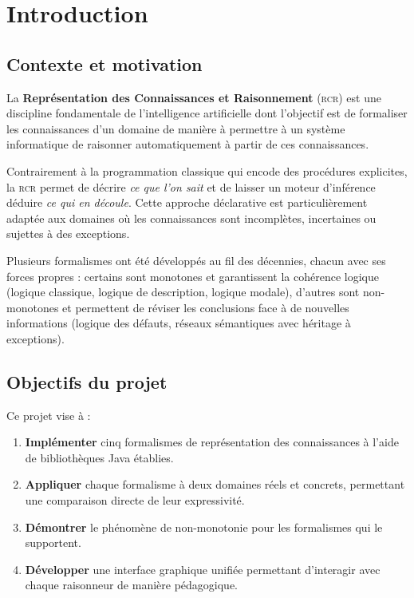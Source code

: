 \chapter{Introduction}

\section{Contexte et motivation}

La \textbf{Représentation des Connaissances et Raisonnement} (\textsc{rcr}) est
une discipline fondamentale de l'intelligence artificielle dont l'objectif est de
formaliser les connaissances d'un domaine de manière à permettre à un système
informatique de raisonner automatiquement à partir de ces connaissances.

Contrairement à la programmation classique qui encode des procédures explicites,
la \textsc{rcr} permet de décrire \emph{ce que l'on sait} et de laisser un
moteur d'inférence déduire \emph{ce qui en découle}. Cette approche déclarative
est particulièrement adaptée aux domaines où les connaissances sont incomplètes,
incertaines ou sujettes à des exceptions.

Plusieurs formalismes ont été développés au fil des décennies, chacun avec ses
forces propres : certains sont monotones et garantissent la cohérence logique
(logique classique, logique de description, logique modale), d'autres sont
non-monotones et permettent de réviser les conclusions face à de nouvelles
informations (logique des défauts, réseaux sémantiques avec héritage à exceptions).

\section{Objectifs du projet}

Ce projet vise à :

\begin{enumerate}
  \item \textbf{Implémenter} cinq formalismes de représentation des connaissances
        à l'aide de bibliothèques Java établies.
  \item \textbf{Appliquer} chaque formalisme à deux domaines réels et concrets,
        permettant une comparaison directe de leur expressivité.
  \item \textbf{Démontrer} le phénomène de non-monotonie pour les formalismes
        qui le supportent.
  \item \textbf{Développer} une interface graphique unifiée permettant
        d'interagir avec chaque raisonneur de manière pédagogique.
\end{enumerate}


